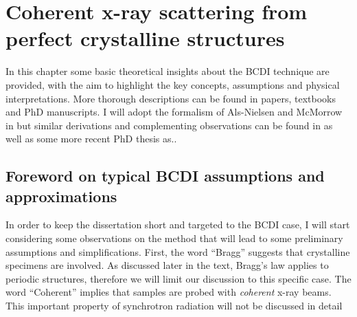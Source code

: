 



\section{Coherent x-ray scattering from perfect crystalline structures}

In this chapter some basic theoretical insights about the BCDI technique are provided, with the aim to highlight the key 
concepts, assumptions and physical interpretations. More thorough descriptions can be found in papers, textbooks 
and PhD manuscripts. I will adopt the formalism of Als-Nielsen and McMorrow in \cite{alsnielsen_mcmorrow2011} but similar 
derivations and complementing observations can be found in \cite{guinier1994} as well as some more recent PhD thesis as.. 

\subsection{Foreword on typical BCDI assumptions and approximations}
In order to keep the dissertation short and targeted to the BCDI case, I will start considering some observations on the 
method that will lead to some preliminary assumptions and simplifications. First, the word ``Bragg'' suggests that 
crystalline specimens are involved. As discussed later in the text, Bragg's law applies to periodic structures, therefore 
we will limit our discussion to this specific case. 
The word ``Coherent'' implies that samples are probed with \textit{coherent} x-ray beams. This important property of 
synchrotron radiation will not be discussed in detail 

